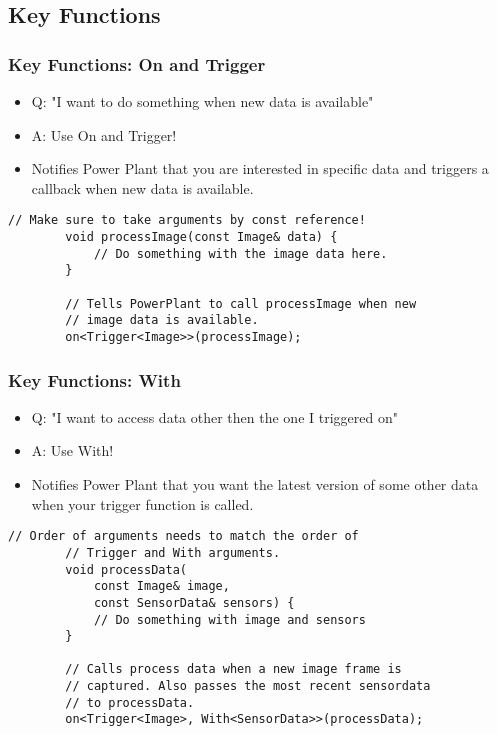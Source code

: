 \documentclass{beamer}
\begin{document}
\subsection{Key Functions}
\begin{frame}[fragile]
	\frametitle {Key Functions: On and Trigger}
	\begin{itemize}
		\item Q: "I want to do something when new data is available"
		\item A: Use On and Trigger!
		\item Notifies Power Plant that you are interested in specific data and triggers a callback when new data is available.
	\end{itemize}

	\begin{lstlisting}[language=nuclear]
		// Make sure to take arguments by const reference!
		void processImage(const Image& data) {
		    // Do something with the image data here.
		}

		// Tells PowerPlant to call processImage when new
		// image data is available.
		on<Trigger<Image>>(processImage);
	\end{lstlisting}
\end{frame}

\begin{frame}[fragile]
	\frametitle {Key Functions: With}
	\begin{itemize}
		\item Q: "I want to access data other then the one I triggered on"
		\item A: Use With!
		\item Notifies Power Plant that you want the latest version of some other data when your trigger function is called.
	\end{itemize}

	\begin{lstlisting}[language=nuclear]
		// Order of arguments needs to match the order of 
		// Trigger and With arguments.
		void processData(
		    const Image& image,
		    const SensorData& sensors) {
		    // Do something with image and sensors
		}

		// Calls process data when a new image frame is 
		// captured. Also passes the most recent sensordata
		// to processData.
		on<Trigger<Image>, With<SensorData>>(processData);
	\end{lstlisting}
\end{frame}
\end{document}
